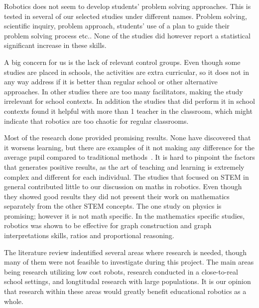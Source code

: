 \bigskip\noindent
Robotics does not seem to develop students' problem solving approaches. This is tested in several of our selected studies under different names. Problem solving, scientific inquiry, problem approach, students' use of a plan to guide their problem solving process etc.. None of the studies did however report a statistical significant increase in these skills. 

\bigskip\noindent
A big concern for us is the lack of relevant control groups. Even though some studies are placed in schools, the activities are extra curricular, so it does not in any way address if it is better than regular school or other alternative approaches. In other studies there are too many facilitators, making the study irrelevant for school contexts. In addition the studies that did perform it in school contexts found it helpful with more than 1 teacher in the classroom, which might indicate that robotics are too chaotic for regular classrooms. 

\bigskip\noindent
Most of the research done provided promising results. None have discovered that it worsens learning, but there are examples of it not making any difference for the average pupil compared to traditional methods~\cite{lindh2007does}. It is hard to pinpoint the factors that generates positive results, as the art of teaching and learning is extremely complex and different for each individual. The studies that focused on STEM in general contributed little to our discussion on maths in robotics. Even though they showed good results they did not present their work on mathematics separately from the other STEM concepts. The one study on physics is promising; however it is not math specific. In the mathematics specific studies, robotics was shown to be effective for graph construction and graph interpretations skills, ratios and proportional reasoning. 


\bigskip\noindent
The literature review indentified several areas where research is needed, though many of them were not feasible to investigate during this project. 
The main areas being research utilizing low cost robots, research conducted in a close-to-real school settings, and longtitudal research with large populations. 
It is our opinion that research within these areas would greatly benefit educational robotics as a whole. 
